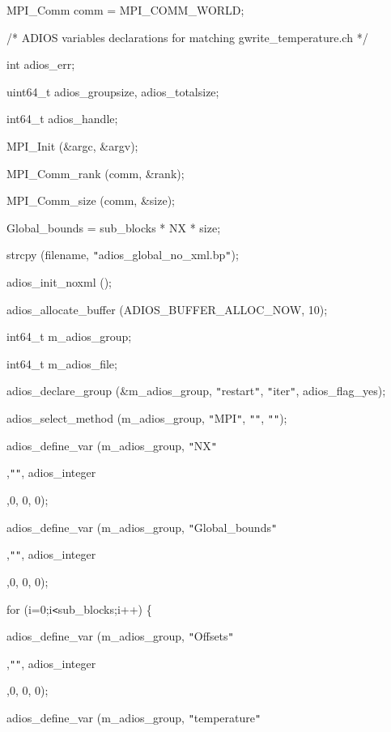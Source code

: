 \parindent=57pt
MPI\_Comm    comm = MPI\_COMM\_WORLD;

\parindent=28pt
/* ADIOS variables declarations for matching gwrite\_temperature.ch */

int         adios\_err;

\parindent=57pt
uint64\_t    adios\_groupsize, adios\_totalsize;

\parindent=28pt
int64\_t     adios\_handle;

MPI\_Init (\&argc, \&argv);

\parindent=57pt
MPI\_Comm\_rank (comm, \&rank);

\parindent=28pt
MPI\_Comm\_size (comm, \&size);

Global\_bounds = sub\_blocks * NX * size;

\parindent=57pt
strcpy (filename, \texttt{"}adios\_global\_no\_xml.bp\texttt{"});

\parindent=28pt
adios\_init\_noxml ();

adios\_allocate\_buffer (ADIOS\_BUFFER\_ALLOC\_NOW, 10);

\parindent=57pt
int64\_t       m\_adios\_group;

\parindent=28pt
int64\_t       m\_adios\_file;

adios\_declare\_group (\&m\_adios\_group, \texttt{"}restart\texttt{"}, \texttt{"}iter\texttt{"}, 
adios\_flag\_yes);

\parindent=57pt
adios\_select\_method (m\_adios\_group, \texttt{"}MPI\texttt{"}, \texttt{"}\texttt{"}, 
\texttt{"}\texttt{"});

\parindent=28pt
adios\_define\_var (m\_adios\_group, \texttt{"}NX\texttt{"}

\parindent=86pt
,\texttt{"}\texttt{"}, adios\_integer

,0, 0, 0);

\parindent=115pt
adios\_define\_var (m\_adios\_group, \texttt{"}Global\_bounds\texttt{"}

\parindent=86pt
,\texttt{"}\texttt{"}, adios\_integer

,0, 0, 0);

\parindent=115pt
for (i=0;i\texttt{<}sub\_blocks;i++) \{

\parindent=39pt
adios\_define\_var (m\_adios\_group, \texttt{"}Offsets\texttt{"}

\parindent=86pt
,\texttt{"}\texttt{"}, adios\_integer

,0, 0, 0);

\parindent=126pt
adios\_define\_var (m\_adios\_group, \texttt{"}temperature\texttt{"}

